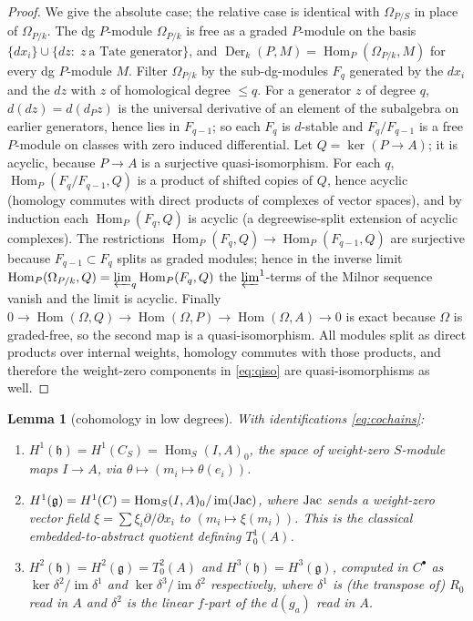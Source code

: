\documentclass[11pt]{article}
\newtheorem{lemma}[theorem]{Lemma}
\theoremstyle{definition}
\theoremstyle{remark}
\newcommand{\Der}{\operatorname{Der}}
\newcommand{\Hom}{\operatorname{Hom}}
\newcommand{\im}{\operatorname{im}}
\newcommand{\g}{\mathfrak g}
\newcommand{\h}{\mathfrak h}
\begin{document}
\begin{proof}
We give the absolute case; the relative case is identical with
$\Omega_{P/S}$ in place of $\Omega_{P/k}$.  The dg $P$-module
$\Omega_{P/k}$ is free as a graded $P$-module on the basis
$\{dx_i\}\cup\{dz:\;z\ \text{a Tate generator}\}$, and
$\Der_k(P,M)=\Hom_P(\Omega_{P/k},M)$ for every dg $P$-module $M$.  Filter
$\Omega_{P/k}$ by the sub-dg-modules $F_q$ generated by the $dx_i$ and the
$dz$ with $z$ of homological degree $\leq q$.  For a generator $z$ of degree
$q$, $d(dz)=d(d_Pz)$ is the universal derivative of an element of the
subalgebra on earlier generators, hence lies in $F_{q-1}$; so each $F_q$ is
$d$-stable and $F_q/F_{q-1}$ is a free $P$-module on classes with zero
induced differential.  Let $Q=\ker(P\to A)$; it is acyclic, because $P\to A$
is a surjective quasi-isomorphism.  For each $q$,
$\Hom_P(F_q/F_{q-1},Q)$ is a product of shifted copies of $Q$, hence
acyclic (homology commutes with direct products of complexes of vector
spaces), and by induction each $\Hom_P(F_q,Q)$ is acyclic (a degreewise-split
extension of acyclic complexes).  The restrictions
$\Hom_P(F_q,Q)\to\Hom_P(F_{q-1},Q)$ are surjective because
$F_{q-1}\subset F_q$ splits as graded modules; hence in the inverse limit
$\Hom_P(\Omega_{P/k},Q)=\varprojlim_q\Hom_P(F_q,Q)$ the
$\varprojlim^1$-terms of the Milnor sequence vanish and the limit is
acyclic.  Finally $0\to\Hom(\Omega,Q)\to\Hom(\Omega,P)\to\Hom(\Omega,A)\to0$
is exact because $\Omega$ is graded-free, so the second map is a
quasi-isomorphism.  All modules split as direct products over internal
weights, homology commutes with those products, and therefore the
weight-zero components in \eqref{eq:qiso} are quasi-isomorphisms as well.
\end{proof}

\begin{lemma}[cohomology in low degrees]\label{lem:lowcoh}
With identifications \eqref{eq:cochains}:
\begin{enumerate}
\item $H^1(\h)=H^1(C_S)=\Hom_S(I,A)_0$, the space of weight-zero
$S$-module maps $I\to A$, via $\theta\mapsto(m_i\mapsto\theta(e_i))$.
\item $H^1(\g)=H^1(C)=\Hom_S(I,A)_0/\im(\textup{Jac})$, where
$\textup{Jac}$ sends a weight-zero vector field
$\xi=\sum\xi_i\partial/\partial x_i$ to $(m_i\mapsto\xi(m_i))$.  This is
the classical embedded-to-abstract quotient defining $T^1_0(A)$.
\item $H^2(\h)=H^2(\g)=T^2_0(A)$ and $H^3(\h)=H^3(\g)$, computed in
$C^\bullet$ as $\ker\delta^2/\im\delta^1$ and $\ker\delta^3/\im\delta^2$
respectively, where $\delta^1$ is (the transpose of) $R_0$ read in $A$ and
$\delta^2$ is the linear $f$-part of the $d(g_a)$ read in $A$.
\end{enumerate}
\end{lemma}
\end{document}
